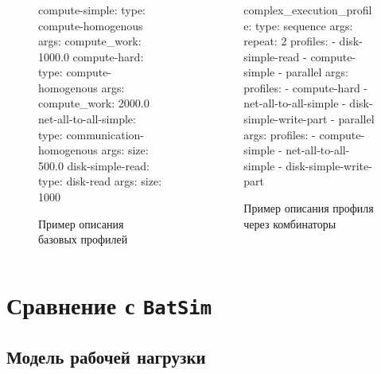 \documentclass[t]{beamer}  %
\begin{document}
\begin{frame}[fragile]
	\frametitle{\insertsection}
	\framesubtitle{\insertsubsection}

	\vspace{-1cm}
	\begin{columns}
		\scriptsize
	\begin{column}{0.5\textwidth}
		\begin{figure}[H]
			\centering
		\begin{yamlcode}
compute-simple: 
  type: compute-homogenous
  args: 
	compute_work: 1000.0 
compute-hard:
  type: compute-homogenous
  args:
	compute_work: 2000.0
net-all-to-all-simple:
  type: communication-homogenous
  args: 
	size: 500.0 
disk-simple-read: 
  type: disk-read 
  args: 
	size: 1000
		\end{yamlcode}
		\caption*{Пример описания базовых профилей}
	\end{figure}
	\end{column}
	\hspace{-0.5cm}
	\begin{column}{0.6\textwidth}
		\begin{figure}[H]
			\centering
		\begin{yamlcode}
complex_execution_profile:
  type: sequence
  args:
    repeat: 2
    profiles:
      - disk-simple-read
      - compute-simple
      - parallel
    	args:
    	  profiles:
            - compute-hard
            - net-all-to-all-simple
      - disk-simple-write-part
      - parallel
    	args:
    	  profiles:
            - compute-simple
            - net-all-to-all-simple
      - disk-simple-write-part
	\end{yamlcode}
	\vspace{-0.2cm}
		\caption*{Пример описания профиля через комбинаторы}
\end{figure}
	\end{column}
	\end{columns}

\end{frame}


\section{Сравнение с \texttt{BatSim}}
\subsection{Модель рабочей нагрузки}
\end{document}
